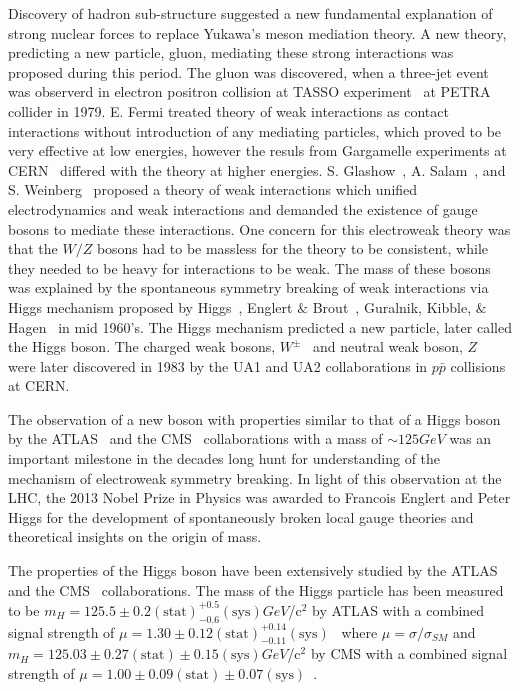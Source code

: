 Discovery of hadron sub-structure suggested a new fundamental explanation of strong nuclear forces to replace Yukawa's meson mediation theory. A
new theory, predicting a new particle, gluon, mediating these strong interactions was proposed during this period. The gluon was discovered,
when a three-jet event was observerd in electron positron collision at TASSO experiment~\cite{Gluons1979} at PETRA collider in 1979. E. Fermi 
treated theory of weak interactions as contact interactions without  introduction of any mediating particles, which proved to be very effective at 
low energies, however the resuls from Gargamelle experiments at CERN~\cite{Hasert:1973ff} differed with the theory at higher energies. 
S. Glashow~\cite{Glashow:1961tr}, A. Salam~\cite{Salam:1964ry}, and S. Weinberg~\cite{Weinberg:1967tq} proposed a 
theory of weak interactions which unified electrodynamics and weak interactions and demanded the existence of gauge bosons to mediate these 
interactions. One concern for this electroweak theory was that the $W/Z$ bosons had to be massless for the theory to be consistent, while they needed
to be heavy for interactions to be weak. The mass of these bosons was explained by the spontaneous symmetry breaking of weak 
interactions via Higgs mechanism proposed by Higgs~\cite{Higgs:1964ia,Higgs:1964pj,Higgs:1966ev}, Englert $\&$ Brout~\cite{Englert:1964et}, Guralnik, 
Kibble, $\&$ Hagen~\cite{Guralnik:1964eu} in mid 1960's. The Higgs mechanism predicted a new particle, later called the Higgs boson. The charged weak 
bosons, $W^{\pm}$~\cite{Arnison:1983rp,Banner:1983jy} and neutral weak boson, $Z$~\cite{Arnison:1983mk,Arnison:1983zy, Bagnaia:1983zx} were later 
discovered in 1983 by the UA1 and UA2 collaborations in $p\bar{p}$ collisions at \gls{CERN}. 

The observation of a new boson with properties similar to that of a Higgs boson by the \gls{ATLAS}~\cite{Aad:2012tfa} and the 
CMS~\cite{Chatrchyan:2012xdj} collaborations with a mass of $\sim125\unit{GeV}$ was an important milestone in the decades long 
hunt for understanding of the mechanism of electroweak symmetry breaking. In light of this observation at the LHC, the 2013 Nobel 
Prize in Physics was awarded to Francois Englert and Peter Higgs for the development  of spontaneously broken local gauge theories 
and theoretical insights on the origin of mass.

The properties of the Higgs boson have been extensively studied by the ATLAS~\cite{ATLAS:2014yka} and the CMS~\cite{CMS:yva} collaborations. 
The mass of the Higgs particle has been measured to be $m_{H}=125.5\pm0.2(\text{stat})^{+0.5}_{-0.6}(\text{sys})\unit{GeV}$/c$^{2}$ by ATLAS
 with a combined signal strength of $\mu=1.30\pm0.12(\text{stat})^{+0.14}_{-0.11}(\text{sys})$~\cite{ATLAS:2014yka} where $\mu=\sigma/\sigma_{SM}$
and $m_{H}=125.03\pm0.27(\text{stat})\pm0.15(\text{sys})\unit{GeV}$/c$^{2}$ by CMS with a combined signal strength of $\mu=1.00\pm0.09(\text{stat})
\pm0.07(\text{sys})$~\cite{CMS:yva}.

